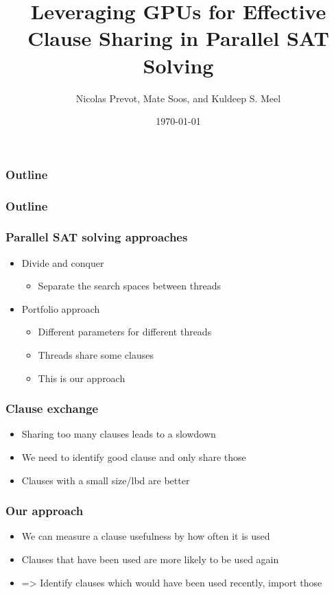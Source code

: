 \documentclass{beamer}
\title{Leveraging GPUs for Effective Clause Sharing in Parallel SAT Solving}
\author{Nicolas Prevot, Mate Soos, and Kuldeep S. Meel}
\date{\today}
\begin{document}
\begin{frame}
\titlepage
\end{frame}

\begin{frame}
\frametitle{Outline}
\tableofcontents
\end{frame}

\begin{frame}
\frametitle{Outline}
\tableofcontents
\end{frame}

\begin{frame}
\frametitle{Parallel SAT solving approaches}
\begin{itemize}
\item Divide and conquer
\begin{itemize}
\item Separate the search spaces between threads
\end{itemize}
\item Portfolio approach
\begin{itemize}
\item Different parameters for different threads
\item Threads share some clauses
\item This is our approach
\end{itemize}
\end{itemize}
\end{frame}

\begin{frame}
\frametitle{Clause exchange}
\begin{itemize}
\item Sharing too many clauses leads to a slowdown
\item We need to identify good clause and only share those
\item Clauses with a small size/lbd are better
\end{itemize}
\end{frame}

\begin{frame}
\frametitle{Our approach}
\begin{itemize}
\item We can measure a clause usefulness by how often it is used
\item Clauses that have been used are more likely to be used again
\item => Identify clauses which would have been used recently, import those
\end{itemize}
\end{frame}
\end{document}
